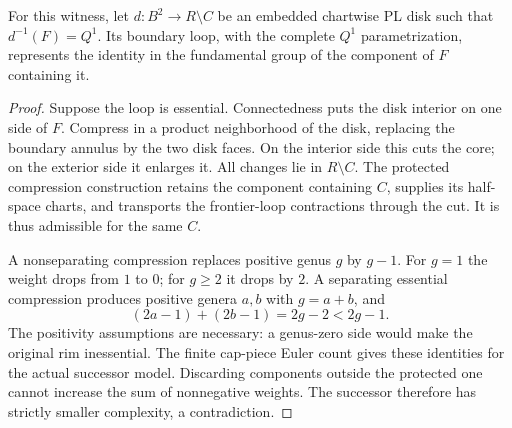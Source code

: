 \begin{proposition}
\label{prop:compact-core-incompressibility}
For this witness, let $d:B^2\to R\setminus C$ be an embedded chartwise PL
disk such that $d^{-1}(F)=Q^1$. Its boundary loop, with the complete
$Q^1$ parametrization, represents the identity in the fundamental group
of the component of $F$ containing it.
\end{proposition}
\begin{proof}
Suppose the loop is essential. Connectedness puts the disk interior on
one side of $F$. Compress in a product neighborhood of the disk, replacing
the boundary annulus by the two disk faces. On the interior side this
cuts the core; on the exterior side it enlarges it. All changes lie in
$R\setminus C$. The protected compression construction retains the
component containing $C$, supplies its half-space charts, and transports
the frontier-loop contractions through the cut. It is thus admissible
for the same $C$.

A nonseparating compression replaces positive genus $g$ by $g-1$.
For $g=1$ the weight drops from $1$ to $0$; for $g\geq2$ it drops by $2$.
A separating essential compression produces positive genera $a,b$ with
$g=a+b$, and
\[
 (2a-1)+(2b-1)=2g-2<2g-1.
\]
The positivity assumptions are necessary: a genus-zero side would make
the original rim inessential. The finite cap-piece Euler count gives
these identities for the actual successor model. Discarding components
outside the protected one cannot increase the sum of nonnegative weights.
The successor therefore has strictly smaller complexity, a contradiction.
\end{proof}

